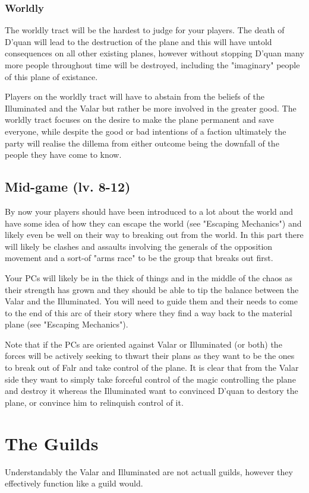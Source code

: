 \documentclass[10pt,twoside,twocolumn]{article}
\begin{document}
\subsubsection{Worldly}
The worldly tract will be the hardest to judge for your players. The death of D'quan will lead to the destruction of the plane and this will have untold consequences on all other existing planes, however without stopping D'quan many more people throughout time will be destroyed, including the "imaginary" people of this plane of existance.

Players on the worldly tract will have to abstain from the beliefs of the Illuminated and the Valar but rather be more involved in the greater good. The worldly tract focuses on the desire to make the plane permanent and save everyone, while despite the good or bad intentions of a faction ultimately the party will realise the dillema from either outcome being the downfall of the people they have come to know.

\subsection{Mid-game (lv. 8-12)}
By now your players should have been introduced to a lot about the world and have some idea of how they can escape the world (see "Escaping Mechanics") and likely even be well on their way to breaking out from the world. In this part there will likely be clashes and assaults involving the generals of the opposition movement and a sort-of "arms race" to be the group that breaks out first.

Your PCs will likely be in the thick of things and in the middle of the chaos as their strength has grown and they should be able to tip the balance between the Valar and the Illuminated. You will need to guide them and their needs to come to the end of this arc of their story where they find a way back to the material plane (see "Escaping Mechanics").

Note that if the PCs are oriented against Valar or Illuminated (or both) the forces will be actively seeking to thwart their plans as they want to be the ones to break out of Falr and take control of the plane. It is clear that from the Valar side they want to simply take forceful control of the magic controlling the plane and destroy it whereas the Illuminated want to convinced D'quan to destory the plane, or convince him to relinquish control of it.

\section{The Guilds}
Understandably the Valar and Illuminated are not actuall guilds, however they effectively function like a guild would.
\end{document}
